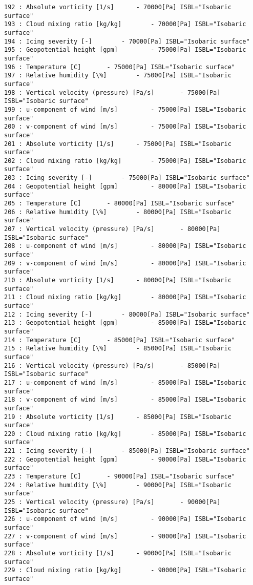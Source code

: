 \documentclass[11pt]{article}
\begin{document}
\begin{Verbatim}[commandchars=\\\{\}]
192 : Absolute vorticity [1/s] 		- 70000[Pa] ISBL="Isobaric surface"
193 : Cloud mixing ratio [kg/kg] 		- 70000[Pa] ISBL="Isobaric surface"
194 : Icing severity [-] 		- 70000[Pa] ISBL="Isobaric surface"
195 : Geopotential height [gpm] 		- 75000[Pa] ISBL="Isobaric surface"
196 : Temperature [C] 		- 75000[Pa] ISBL="Isobaric surface"
197 : Relative humidity [\%] 		- 75000[Pa] ISBL="Isobaric surface"
198 : Vertical velocity (pressure) [Pa/s] 		- 75000[Pa] ISBL="Isobaric surface"
199 : u-component of wind [m/s] 		- 75000[Pa] ISBL="Isobaric surface"
200 : v-component of wind [m/s] 		- 75000[Pa] ISBL="Isobaric surface"
201 : Absolute vorticity [1/s] 		- 75000[Pa] ISBL="Isobaric surface"
202 : Cloud mixing ratio [kg/kg] 		- 75000[Pa] ISBL="Isobaric surface"
203 : Icing severity [-] 		- 75000[Pa] ISBL="Isobaric surface"
204 : Geopotential height [gpm] 		- 80000[Pa] ISBL="Isobaric surface"
205 : Temperature [C] 		- 80000[Pa] ISBL="Isobaric surface"
206 : Relative humidity [\%] 		- 80000[Pa] ISBL="Isobaric surface"
207 : Vertical velocity (pressure) [Pa/s] 		- 80000[Pa] ISBL="Isobaric surface"
208 : u-component of wind [m/s] 		- 80000[Pa] ISBL="Isobaric surface"
209 : v-component of wind [m/s] 		- 80000[Pa] ISBL="Isobaric surface"
210 : Absolute vorticity [1/s] 		- 80000[Pa] ISBL="Isobaric surface"
211 : Cloud mixing ratio [kg/kg] 		- 80000[Pa] ISBL="Isobaric surface"
212 : Icing severity [-] 		- 80000[Pa] ISBL="Isobaric surface"
213 : Geopotential height [gpm] 		- 85000[Pa] ISBL="Isobaric surface"
214 : Temperature [C] 		- 85000[Pa] ISBL="Isobaric surface"
215 : Relative humidity [\%] 		- 85000[Pa] ISBL="Isobaric surface"
216 : Vertical velocity (pressure) [Pa/s] 		- 85000[Pa] ISBL="Isobaric surface"
217 : u-component of wind [m/s] 		- 85000[Pa] ISBL="Isobaric surface"
218 : v-component of wind [m/s] 		- 85000[Pa] ISBL="Isobaric surface"
219 : Absolute vorticity [1/s] 		- 85000[Pa] ISBL="Isobaric surface"
220 : Cloud mixing ratio [kg/kg] 		- 85000[Pa] ISBL="Isobaric surface"
221 : Icing severity [-] 		- 85000[Pa] ISBL="Isobaric surface"
222 : Geopotential height [gpm] 		- 90000[Pa] ISBL="Isobaric surface"
223 : Temperature [C] 		- 90000[Pa] ISBL="Isobaric surface"
224 : Relative humidity [\%] 		- 90000[Pa] ISBL="Isobaric surface"
225 : Vertical velocity (pressure) [Pa/s] 		- 90000[Pa] ISBL="Isobaric surface"
226 : u-component of wind [m/s] 		- 90000[Pa] ISBL="Isobaric surface"
227 : v-component of wind [m/s] 		- 90000[Pa] ISBL="Isobaric surface"
228 : Absolute vorticity [1/s] 		- 90000[Pa] ISBL="Isobaric surface"
229 : Cloud mixing ratio [kg/kg] 		- 90000[Pa] ISBL="Isobaric surface"

\end{Verbatim}
\end{document}
